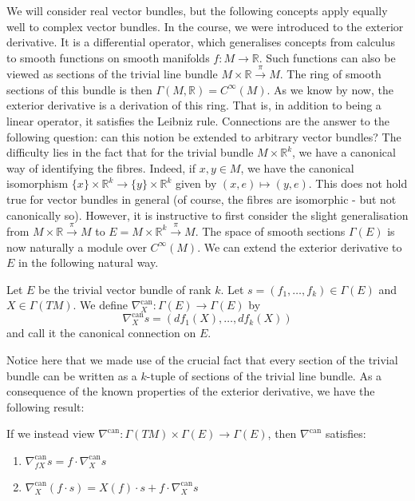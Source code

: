We will consider real vector bundles, but the following concepts apply equally well to complex vector bundles. In the course, we were introduced to the exterior derivative. It is a differential operator, which generalises concepts from calculus to smooth functions on smooth manifolds $f:M\to\mathbb{R}$. Such functions can also be viewed as sections of the trivial line bundle $M\times\mathbb{R}\xrightarrow{\pi}M$. The ring of smooth sections of this bundle is then $\Gamma(M,\mathbb{R})=C^\infty(M)$. As we know by now, the exterior derivative is a derivation of this ring. That is, in addition to being a linear operator, it satisfies the Leibniz rule. Connections are the answer to the following question: can this notion be extended to arbitrary vector bundles? The difficulty lies in the fact that for the trivial bundle $M\times\mathbb{R}^k$, we have a canonical way of identifying the fibres. Indeed, if $x,y\in M$, we have the canonical isomorphism $\{x\}\times\mathbb{R}^k\to\{y\}\times\mathbb{R}^k$ given by $(x,e)\mapsto (y,e)$. This does not hold true for vector bundles in general (of course, the fibres are isomorphic - but not canonically so). However, it is instructive to first consider the slight generalisation from $M\times\mathbb{R}\xrightarrow{\pi}M$ to $E=M\times\mathbb{R}^k\xrightarrow{\pi}M$. The space of smooth sections $\Gamma(E)$ is now naturally a module over $C^\infty(M)$. We can extend the exterior derivative to $E$ in the following natural way.
\begin{definition}
  Let $E$ be the trivial vector bundle of rank $k$. Let $s=(f_1,\dots,f_k)\in\Gamma(E)$ and $X\in\Gamma(TM)$. We define $\nabla^\text{can}_X:\Gamma(E)\to\Gamma(E)$ by $$\nabla^\text{can}_Xs=(df_1(X),\dots,df_k(X))$$
  and call it the canonical connection on $E$.
\end{definition} 
Notice here that we made use of the crucial fact that every section of the trivial bundle can be written as a $k$-tuple of sections of the trivial line bundle. As a consequence of the known properties of the exterior derivative, we have the following result:
\begin{proposition}
  If we instead view $\nabla^\text{can}:\Gamma(TM)\times\Gamma(E)\to\Gamma(E)$, then $\nabla^\text{can}$ satisfies:
  \begin{enumerate}
    \item $\nabla_{fX}^\text{can}s=f\cdot\nabla^\text{can}_Xs$
    \item $\nabla^\text{can}_X(f\cdot s)=X(f)\cdot s+f\cdot\nabla^\text{can}_Xs$
  \end{enumerate}
\end{proposition}
